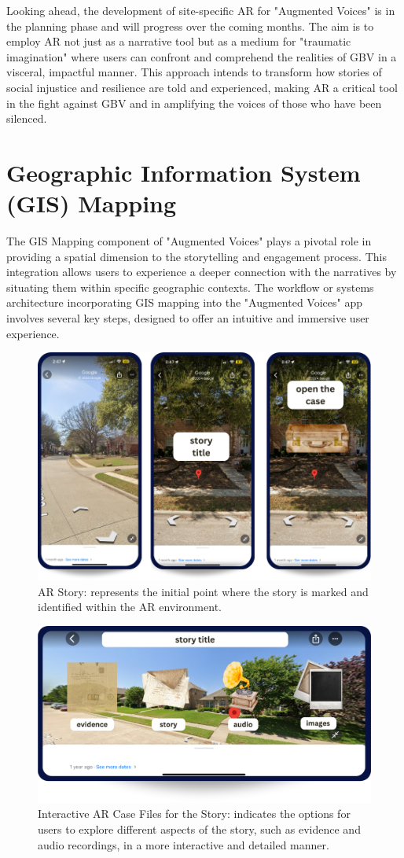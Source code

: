 \documentclass[manuscript,screen]{acmart}
\begin{document}
Looking ahead, the development of site-specific AR for "Augmented Voices" is in the planning phase and will progress over the coming months. The aim is to employ AR not just as a narrative tool but as a medium for "traumatic imagination" where users can confront and comprehend the realities of GBV in a visceral, impactful manner. This approach intends to transform how stories of social injustice and resilience are told and experienced, making AR a critical tool in the fight against GBV and in amplifying the voices of those who have been silenced.

\section{Geographic Information System (GIS) Mapping}
The GIS Mapping component of "Augmented Voices" plays a pivotal role in providing a spatial dimension to the storytelling and engagement process. This integration allows users to experience a deeper connection with the narratives by situating them within specific geographic contexts. The workflow or systems architecture incorporating GIS mapping into the "Augmented Voices" app involves several key steps, designed to offer an intuitive and immersive user experience.


\begin{figure}
    \centering
    \includegraphics[width=0.75\linewidth]{incident.png}
    \caption{AR Story: represents the initial point where the story is marked and identified within the AR environment.}
    \label{fig:1}
\end{figure}
\begin{figure}
    \centering
    \includegraphics[width=0.75\linewidth]{options.png}
    \caption{Interactive AR Case Files for the Story: indicates the options for users to explore different aspects of the story, such as evidence and audio recordings, in a more interactive and detailed manner.}
    \label{fig:2}
\end{figure}
\end{document}

